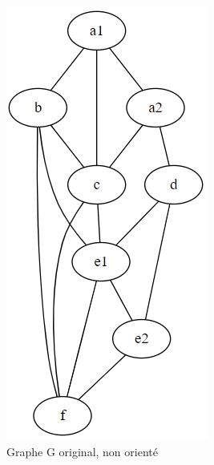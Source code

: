 \begin{figure}[H]
\begin{minipage}[b]{0.3\textwidth}
    \caption{Graphe G original, non orienté}
    \label{graph_g}
  \end{minipage}
  \hfill
  \begin{minipage}[b]{0.3\textwidth}
    \includegraphics[width=\textwidth]{imgs/linear_g_graph.PNG}

\end{minipage}
\end{figure}
